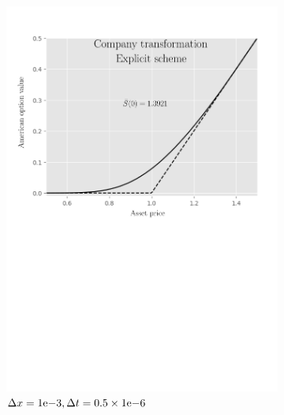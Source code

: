 \begin{figure}[H]
\begin{subfigure}{0.4\textwidth}
    \includegraphics[width=\textwidth]{chapters/chapter3/TestCase3ExplicitCompany.pdf}
    \caption{$\Delta{x}={1}\mathrm{e}{-3}, \Delta{t}=0.5\times{1}\mathrm{e}{-6}$}
    \label{fig:finitedifferencesschemes:numericaresults:test_case_3_explicit_company}
  \end{subfigure}
  \begin{subfigure}{0.4\textwidth}
    \centering

\end{subfigure}
\end{figure}
